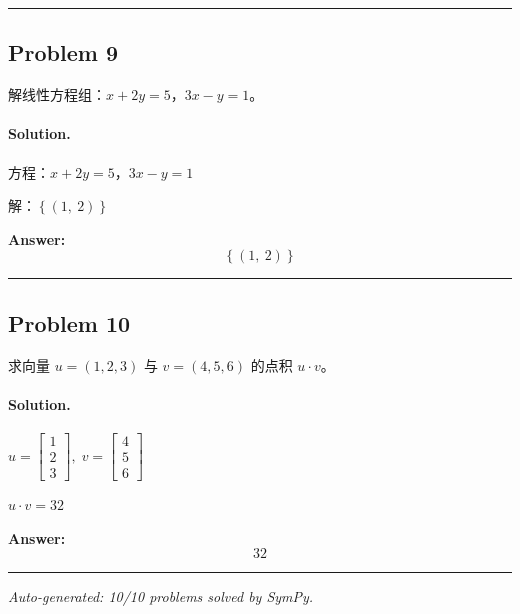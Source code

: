 \documentclass[12pt, a4paper]{ctexart}
\newcommand{\problem}[1]{\subsection*{Problem #1}}
\newcommand{\solution}{\paragraph{Solution.}}
\begin{document}
\vspace{1em}
\hrule
\vspace{1em}

\problem{9}

解线性方程组：$x + 2y = 5$，$3x - y = 1$。

\solution

方程：$x + 2 y = 5$，$3 x - y = 1$

解：$\left\{\left( 1, \  2\right)\right\}$

\textbf{Answer:}
\[\boxed{\left\{\left( 1, \  2\right)\right\}}\]

\vspace{1em}
\hrule
\vspace{1em}

\problem{10}

求向量 $u = (1, 2, 3)$ 与 $v = (4, 5, 6)$ 的点积 $u \cdot v$。

\solution

$u = \left[\begin{matrix}1\\2\\3\end{matrix}\right],\; v = \left[\begin{matrix}4\\5\\6\end{matrix}\right]$

$u \cdot v = 32$

\textbf{Answer:}
\[\boxed{32}\]

\vspace{1em}
\hrule
\vspace{1em}


\vspace{2em}
\noindent\textit{Auto-generated: 10/10 problems solved by SymPy.}
\end{document}
